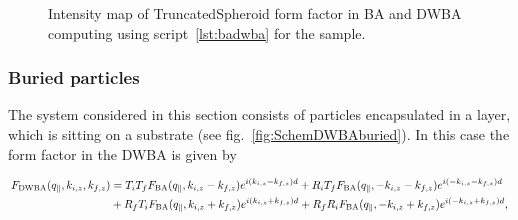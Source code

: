 \begin{figure}[ht]
\hfill
{}
\hfill
{}
\hfill
\caption{Intensity map of TruncatedSpheroid form factor in BA and DWBA computing using script~\ref{lst:badwba} for the sample.}
\label{fig:spheroidbadwba}
\end{figure}

\FloatBarrier 


\subsubsection{Buried particles} 

The system considered in this section consists of particles encapsulated in a layer, which is sitting on a substrate (see fig.~\ref{fig:SchemDWBAburied}). In this case the form factor in the DWBA is given by

\begin{align}
F_{\rm{DWBA}}(q_{\parallel}, k_{i,z}, k_{f,z}) &= T_i T_f F_{\rm{BA}}(q_{\parallel}, k_{i,z}-k_{f,z})e^{i(k_{i,z}-k_{f,z})d}+ R_i T_f F_{\rm{BA}}(q_{\parallel}, -k_{i,z}-k_{f,z})e^{i(-k_{i,z}-k_{f,z})d} \nonumber \\
&+ R_f T_i F_{\rm{BA}}(q_{\parallel}, k_{i,z}+k_{f,z}) e^{i(k_{i,z}+k_{f,z})d}+ R_f R_iF_{\rm{BA}}(q_{\parallel},-k_{i,z}+k_{f,z})e^{i(-k_{i,z}+k_{f,z})d}, \label{eq:dwbaburied}
\end{align}

